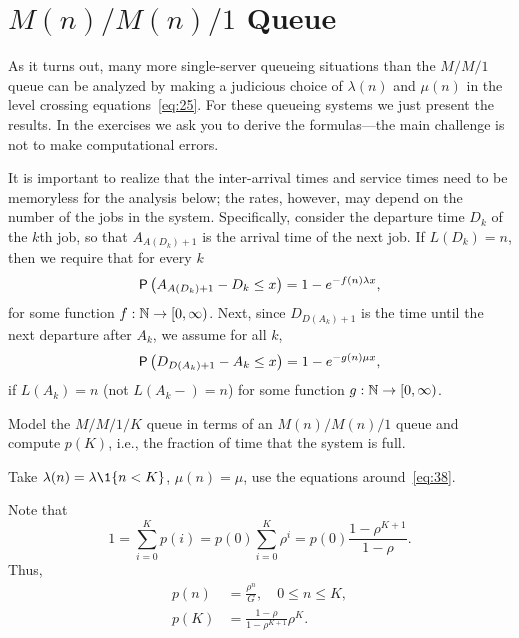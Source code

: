 \section
{$M(n)/M(n)/1$ Queue}
\label{sec:mnmn1}



As it turns out, many more single-server queueing situations than the $M/M/1$ queue can be analyzed by making a judicious choice of $\lambda(n)$ and $\mu(n)$ in the level crossing equations~\cref{eq:25}.
For these queueing systems we just present the results.
In the exercises we ask you to derive the formulas---the main challenge is not to make computational errors.

It is important to realize that the inter-arrival times and service times need to be memoryless for the analysis below; the rates, however, may  depend on the number of the jobs in the system. Specifically, consider the departure time $D_k$ of the $k$th job, so that $A_{A(D_k)+1}$ is the arrival time of the next job. If $L(D_k)=n$, then we require that for every $k$ 
\begin{equation*}
  \P{A_{A(D_k)+1} - D_k \leq x} = 1-e^{-f(n) \lambda x},
\end{equation*}
for some function $f:\mathbb{N}\to [0,\infty)$. Next, since $D_{D(A_k)+1}$ is the time until the next departure after $A_k$, we assume for all $k$,
\begin{equation*}
  \P{D_{D(A_k)+1} - A_k \leq x} = 1-e^{-g(n) \mu x},
\end{equation*}
if $L(A_k)=n$ (not $L(A_k-)=n$) for some function $g:\mathbb{N} \to [0,\infty)$. 


  \begin{exercise}
    Model the $M/M/1/K$ queue in terms of an $M(n)/M(n)/1$ queue and compute $p(K)$, i.e., the fraction of time that the system is full.
\begin{hint}
  Take $\lambda(n) = \lambda \1{n < K}$, $\mu(n) = \mu$, use the equations around~\cref{eq:38}.
\end{hint}
\begin{solution}
Note that 
\begin{equation*}
1 = \sum_{i=0}^K p(i) = p(0)\sum_{i=0}^K \rho^i  = p(0) \frac{1-\rho^{K+1}}{1-\rho}. 
\end{equation*}
Thus,
\begin{subequations}\label{eq:8}
 \begin{align}
p(n) &=  \frac{\rho^n}G, \quad 0\leq n \leq K,\\
p(K) &= \frac{1-\rho}{1-\rho^{K+1}} \rho^K.
\end{align}
\end{subequations}
\end{solution}
\end{exercise}

